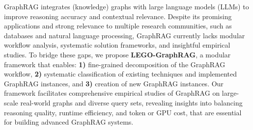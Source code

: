 GraphRAG integrates (knowledge) graphs with large language models (LLMs) to improve reasoning accuracy and contextual relevance. 
Despite its promising applications and strong relevance to multiple research communities, such as databases and natural language processing, GraphRAG currently lacks modular workflow analysis, systematic solution frameworks, and insightful empirical studies. 
To bridge these gaps, we propose {\bf LEGO-GraphRAG}, a modular framework that enables: {\bf 1)} fine-grained decomposition of the GraphRAG workflow, {\bf 2)} systematic classification of existing techniques and implemented GraphRAG instances, and {\bf 3)} creation of new GraphRAG instances. 
Our framework facilitates comprehensive empirical studies of GraphRAG on large-scale real-world graphs and diverse query sets, revealing insights into balancing reasoning quality, runtime efficiency, and token or GPU cost, that are essential for building advanced GraphRAG systems. 






